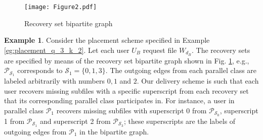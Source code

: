 \documentclass[journal,twocolumn]{IEEEtran}
\theoremstyle{definition}
\newtheorem{example}{Example}
\newcommand{\calP}{\mathcal{P}}
\newcommand{\calS}{\mathcal{S}}
\begin{document}
\begin{figure}[t]
		\centering
		\texttt{[image: Figure2.pdf]}
		\caption{Recovery set bipartite graph}
		\label{Fig:Recovery}
\end{figure}

\begin{example}
	\label{ex:delivery}	
Consider the placement scheme specified in Example \ref{eg:placement_q_3_k_2}. Let each user $U_B$ request file $W_{d_B}$. The recovery sets are specified by means of the recovery set bipartite graph shown in Fig. \ref{Fig:Recovery}, e.g., $\calP_{\calS_1}$ corresponds to $\calS_1 = \{0,1,3\}$. The outgoing edges from each parallel class are labeled arbitrarily with numbers $0, 1$ and $2$. Our delivery scheme is such that each user recovers missing subfiles with a specific superscript from each recovery set that its corresponding parallel class participates in. For instance, a user in parallel class $\calP_1$ recovers missing subfiles with superscript $0$ from $\calP_{\calS_0}$, superscript 1 from $\calP_{\calS_1}$ and superscript 2 from $\calP_{\calS_3}$; these superscripts are the labels of outgoing edges from $\calP_1$ in the bipartite graph.



\end{example}
\end{document}
